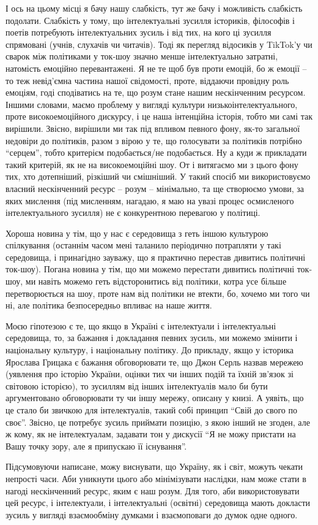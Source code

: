 І ось на цьому місці я бачу нашу слабкість, тут же бачу і можливість слабкість
подолати. Слабкість у тому, що інтелектуальні зусилля істориків, філософів і
поетів потребують інтелектуальних зусиль і від тих, на кого ці зусилля
спрямовані (учнів, слухачів чи читачів). Тоді як перегляд відосиків у TikTok'у
чи сварок між політиками у ток-шоу значно менше інтелектуально затратні,
натомість емоційно перевантажені. Я не те щоб був проти емоцій, бо ж емоції –
то теж невід’ємна частина нашої свідомості, проте, віддаючи провідну роль
емоціям, годі сподіватись на те, що розум стане нашим нескінченним ресурсом.
Іншими словами, маємо проблему у вигляді культури низькоінтелектуального, проте
високоемоційного дискурсу, і це наша інтенційна історія, тобто ми самі так
вирішили. Звісно, вирішили ми так під впливом певного фону, як-то загальної
недовіри до політиків, разом з вірою у те, що голосувати за політиків потрібно
\enquote{серцем}, тобто критерієм подобається/не подобається. Ну а куди ж прикладати
такий критерій, як не на високоемоційні шоу. От і витягаємо ми з цього фону
тих, хто дотепніший, різкіший чи смішніший. У такий спосіб ми використовуємо
власний нескінченний ресурс – розум – мінімально, та ще створюємо умови, за
яких мислення (під мисленням, нагадаю, я маю на увазі процес осмисленого
інтелектуального зусилля) не є конкурентною перевагою у політиці.

Хороша новина у тім, що у нас є середовища з геть іншою культурою спілкування
(останнім часом мені таланило періодично потрапляти у такі середовища, і
принагідно зауважу, що я практично перестав дивитись політичні ток-шоу). Погана
новина у тім, що ми можемо перестати дивитись політичні ток-шоу, ми навіть
можемо геть відсторонитись від політики, котра усе більше перетворюється на
шоу, проте нам від політики не втекти, бо, хочемо ми того чи ні, але політика
безпосередньо впливає на наше життя.

Моєю гіпотезою є те, що якщо в Україні є інтелектуали і інтелектуальні
середовища, то, за бажання і докладання певних зусиль, ми можемо змінити і
національну культуру, і національну політику. До прикладу, якщо у історика
Ярослава Грицака є бажання обговорювати те, що Джон Серль назвав мережею
(уявлення про історію України, оцінки тих чи інших подій та їхній зв’язок зі
світовою історією), то зусиллям від інших інтелектуалів мало би бути
аргументовано обговорювати ту чи іншу мережу, описану у книзі. А уявіть, що це
стало би звичкою для інтелектуалів, такий собі принцип \enquote{Свій до свого по своє}.
Звісно, це потребує зусиль приймати позицію, з якою інший не згоден, але ж
кому, як не інтелектуалам, задавати тон у дискусії \enquote{Я не можу пристати на Вашу
точку зору, але я припускаю її існування}.


Підсумовуючи написане, можу виснувати, що Україну, як і світ, можуть чекати
непрості часи. Аби уникнути цього або мінімізувати наслідки, нам може стати в
нагоді нескінченний ресурс, яким є наш розум. Для того, аби використовувати цей
ресурс, і інтелектуали, і інтелектуальні (освітні) середовища мають докласти
зусиль у вигляді взаємообміну думками і взаємоповаги до думок одне одного.
